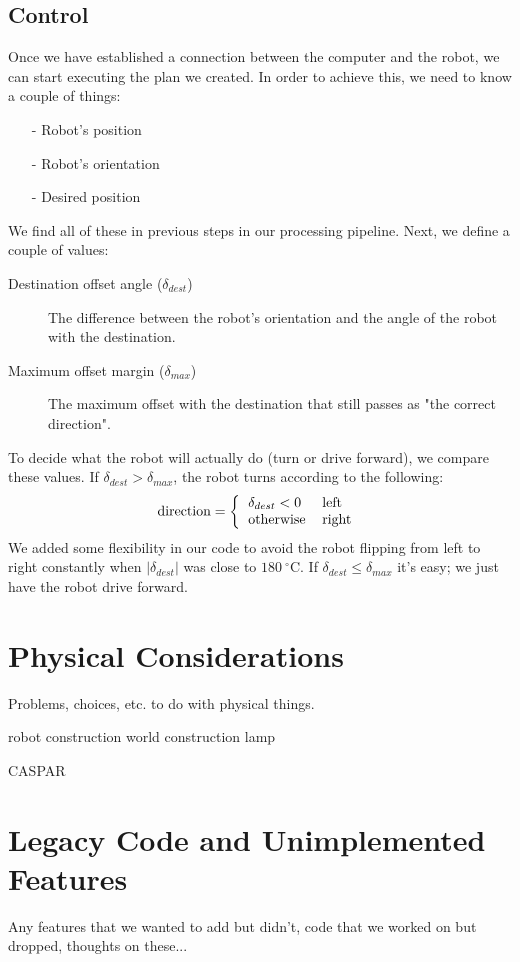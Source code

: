 \documentclass[10pt,twocolumn]{article}
\begin{document}
\subsection{Control}
Once we have established a connection between the computer and the robot, we can start executing the plan we created. In order to achieve this, we need to know a couple of things:
\begin{itemize}
	\item[-] Robot's position
	\item[-] Robot's orientation
	\item[-] Desired position
\end{itemize}
We find all of these in previous steps in our processing pipeline. Next, we define a couple of values:
\begin{description}
\item[Destination offset angle ($\delta_{dest}$)] The difference between the robot's orientation and the angle of the robot with the destination.
\item[Maximum offset margin ($\delta_{max}$)] The maximum offset with the destination that still passes as "the correct direction".
\end{description}
To decide what the robot will actually do (turn or drive forward), we compare these values. If $\delta_{dest} > \delta_{max}$, the robot turns according to the following:
\begin{align*}
\text{direction} = 
\left\{
\begin{tabular}{l l}
$\delta_{dest} < 0$ & left \\
otherwise & right 
\end{tabular}
\right.
\end{align*}
We added some flexibility in our code to avoid the robot flipping from left to right constantly when $\lvert \delta_{dest}\rvert$ was close to $180\ ^{\circ}\mathrm{C}$.
If $\delta_{dest} \leq \delta_{max}$ it's easy; we just have the robot drive forward.

\section{Physical Considerations}
Problems, choices, etc. to do with physical things.

robot construction
world construction
lamp

CASPAR

\section{Legacy Code and Unimplemented Features}
Any features that we wanted to add but didn't, code that we worked on but dropped, thoughts on these...
\end{document}
